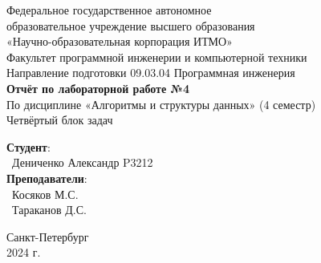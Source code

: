 \documentclass{article}
\begin{document}
\begin{center}
    \Large
    Федеральное государственное автономное \\
    образовательное учреждение высшего образования \\ 
    «Научно-образовательная корпорация ИТМО»\\
    \vspace{0.5cm}
    \large
    Факультет программной инженерии и компьютерной техники \\
    Направление подготовки 09.03.04 Программная инженерия \\
    \vspace{1cm}
    \Large
    \textbf{Отчёт по лабораторной работе №4} \\
    По дисциплине «Алгоритмы и структуры данных» (4 семестр)\\
    Четвёртый блок задач\\
    \large
    \vspace{8cm}

    \begin{minipage}{.33\textwidth}
    \end{minipage}
    \hfill
    \begin{minipage}{.4\textwidth}
    
        \textbf{Студент}: \vspace{.1cm} \\
        \ Дениченко Александр P3212 \vspace{.1cm}\\
        \textbf{Преподаватели}:  \vspace{.1cm}\\
        \ Косяков М.С. \\
        \ Тараканов Д.С.
    \end{minipage}
    \vfill
Санкт-Петербург\\ 2024 г.
\end{center}

\newpage
\end{document}
